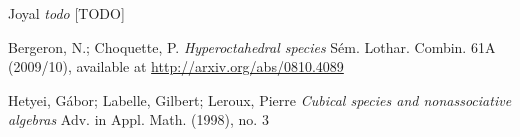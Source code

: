 \begin{thebibliography}{9}

 Joyal \emph{todo} [TODO]

 Bergeron, N.; Choquette, P.
\emph{Hyperoctahedral species} Sém. Lothar. Combin. 61A (2009/10), available at
\url{http://arxiv.org/abs/0810.4089}

 Hetyei, Gábor; Labelle, Gilbert;
Leroux, Pierre \emph{Cubical species and nonassociative algebras} Adv. in Appl.
Math. (1998), no. 3

\end{thebibliography}